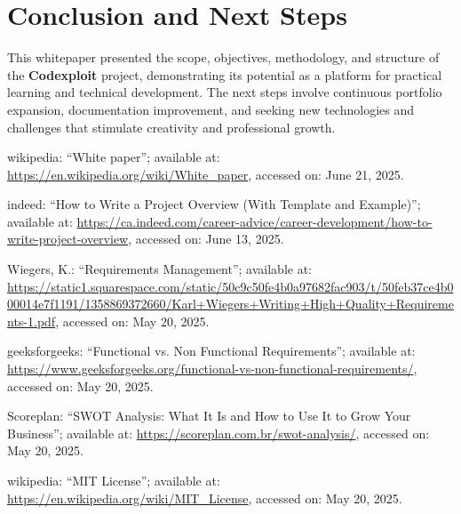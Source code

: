 \documentclass[10pt, a4paper, oneside]{article}
\begin{document}
\section{Conclusion and Next Steps}

This whitepaper presented the scope, objectives, methodology, and structure of the \textbf{Codexploit} project, demonstrating its potential as a platform for practical learning and technical development. The next steps involve continuous portfolio expansion, documentation improvement, and seeking new technologies and challenges that stimulate creativity and professional growth.\newpage

%

\begin{thebibliography}{}{
\fontsize{9pt}{10pt}\selectfont

wikipedia: ``White paper''; available at: \url{https://en.wikipedia.org/wiki/White_paper}, accessed on: June 21, 2025.

indeed: ``How to Write a Project Overview (With Template and Example)''; available at: \url{https://ca.indeed.com/career-advice/career-development/how-to-write-project-overview}, accessed on: June 13, 2025.

Wiegers, K.: ``Requirements Management''; available at: \url{https://static1.squarespace.com/static/50c9c50fe4b0a97682fac903/t/50feb37ce4b000014e7f1191/1358869372660/Karl+Wiegers+Writing+High+Quality+Requirements-1.pdf}, accessed on: May 20, 2025.

geeksforgeeks: ``Functional vs. Non Functional Requirements''; available at: \url{https://www.geeksforgeeks.org/functional-vs-non-functional-requirements/}, accessed on: May 20, 2025.

Scoreplan: ``SWOT Analysis: What It Is and How to Use It to Grow Your Business''; available at: \url{https://scoreplan.com.br/swot-analysis/}, accessed on: May 20, 2025.

wikipedia: ``MIT License''; available at: \url{https://en.wikipedia.org/wiki/MIT_License}, accessed on: May 20, 2025.

}
\end{thebibliography}
\end{document}
